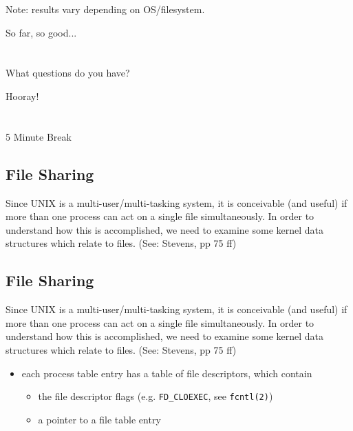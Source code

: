 \documentclass[xga]{xdvislides}
\begin{document}
Note: results vary depending on OS/filesystem.

\newpage
\vspace*{\fill}
\begin{center}
    \Hugesize
        So far, so good...\\ [1em]
    \hspace*{5mm}
    \blueline\\
    \hspace*{5mm}\\
	What questions do you have?
\end{center}
\vspace*{\fill}


\newpage
\vspace*{\fill}
\begin{center}
    \Hugesize
        Hooray! \\ [1em]
    \hspace*{5mm}
    \blueline\\
    \hspace*{5mm}\\
        5 Minute Break
\end{center}
\vspace*{\fill}


\subsection{File Sharing}
Since UNIX is a multi-user/multi-tasking system, it is conceivable (and
useful) if more than one process can act on a single file simultaneously. In
order to understand how this is accomplished, we need to examine some kernel
data structures which relate to files.  (See: Stevens, pp 75 ff)

\subsection{File Sharing}
Since UNIX is a multi-user/multi-tasking system, it is conceivable (and
useful) if more than one process can act on a single file simultaneously. In
order to understand how this is accomplished, we need to examine some kernel
data structures which relate to files.  (See: Stevens, pp 75 ff)

\begin{itemize}
	\item each process table entry has a table of file descriptors, which contain
		\begin{itemize}
			\item the file descriptor flags (e.g. {\tt FD\_CLOEXEC}, see \verb+fcntl(2)+)
			\item a pointer to a file table entry
		\end{itemize}
\end{itemize}
\end{document}
